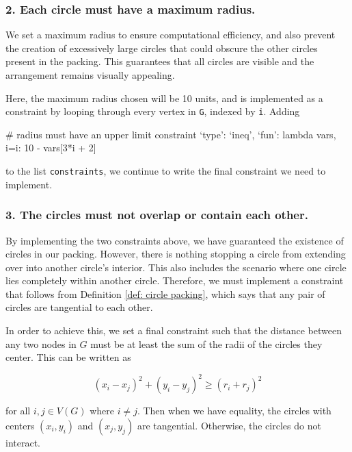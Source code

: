 \subsubsection{2. Each circle must have a maximum radius.}

\begin{flushleft}
We set a maximum radius to ensure computational efficiency, and also prevent the creation of excessively large circles that could obscure the other circles present in the packing. This guarantees that all circles are visible and the arrangement remains visually appealing. 
\end{flushleft}

\begin{flushleft}
Here, the maximum radius chosen will be 10 units, and is implemented as a constraint by looping through every vertex in \texttt{G}, indexed by \texttt{i}. Adding
\end{flushleft}

\begin{code}
    # radius must have an upper limit constraint
    {`type': `ineq', `fun': lambda vars, i=i: 10 - vars[3*i + 2]}
\end{code}

\begin{flushleft}
to the list \texttt{constraints}, we continue to write the final constraint we need to implement.
\end{flushleft}

\subsubsection{3. The circles must not overlap or contain each other.}

\begin{flushleft}
By implementing the two constraints above, we have guaranteed the existence of circles in our packing. However, there is nothing stopping a circle from extending over into another circle's interior. This also includes the scenario where one circle lies completely within another circle. Therefore, we must implement a constraint that follows from Definition \ref{def: circle packing}, which says that any pair of circles are tangential to each other.
\end{flushleft}

\begin{flushleft}
In order to achieve this, we set a final constraint such that the distance between any two nodes in $G$ must be at least the sum of the radii of the circles they center. This can be written as

\[
(x_i - x_j)^2 + (y_i - y_j)^2 \geq (r_i + r_j)^2
\]

\vspace{2mm}
for all $i,j \in V(G)$ where $i \neq j$. Then when we have equality, the circles with centers $(x_i, y_i)$ and $(x_j, y_j)$ are tangential. Otherwise, the circles do not interact.
\end{flushleft}

